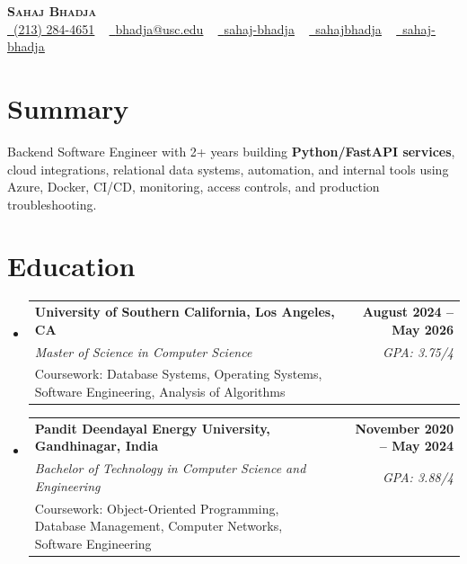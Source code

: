 \documentclass[letterpaper,10pt]{article}
\makeatletter
\newcommand{\sectionGap}{\vspace{-8pt}}
\newcommand{\resumeEduSubheading}[5]{\vspace{-1pt}\item\begin{tabular*}{1.0\textwidth}[t]{l@{\extracolsep{\fill}}r}\textbf{#1} & \textbf{\small #2} \\\textit{\small #3} & \textit{\small #4} \\\small #5 & \\\end{tabular*}\vspace{-4pt}}
\newcommand{\resumeSubHeadingListStart}{\begin{itemize}[leftmargin=0.0in, label={}]}
\newcommand{\resumeSubHeadingListEnd}{\end{itemize}}
\makeatother
\begin{document}
\begin{center}
{\Huge \scshape \textbf{Sahaj Bhadja}} \\ \vspace{1pt}
\small \href{tel:2132844651}{\faPhone\ \underline{(213) 284-4651}} ~ \href{mailto:bhadja@usc.edu}{\raisebox{-0.2\height}\faEnvelope\ \underline{bhadja@usc.edu}} ~
\href{https://www.linkedin.com/in/sahaj-bhadja/}{\raisebox{-0.2\height}\faLinkedin\ \underline{sahaj-bhadja}} ~ \href{https://github.com/SAHAJ-BHADJA}{\raisebox{-0.2\height}\faGithub\ \underline{sahajbhadja}} ~
\href{https://sahaj-bhadja.vercel.app/}{\raisebox{-0.2\height}\faGlobe\ \underline{sahaj-bhadja}}
\end{center}
\vspace{-16pt}
\section{Summary}
\begin{itemize}[leftmargin=0.15in, label={}]
\small{\item{Backend Software Engineer with 2+ years building \textbf{Python/FastAPI services}, cloud integrations, relational data systems, automation, and internal tools using Azure, Docker, CI/CD, monitoring, access controls, and production troubleshooting.}}
\end{itemize}
\sectionGap
\section{Education}
\resumeSubHeadingListStart
\resumeEduSubheading{University of Southern California, Los Angeles, CA}{August 2024 -- May 2026}{Master of Science in Computer Science}{GPA: 3.75/4}{Coursework: Database Systems, Operating Systems, Software Engineering, Analysis of Algorithms}
\resumeEduSubheading{Pandit Deendayal Energy University, Gandhinagar, India}{November 2020 -- May 2024}{Bachelor of Technology in Computer Science and Engineering}{GPA: 3.88/4}{Coursework: Object-Oriented Programming, Database Management, Computer Networks, Software Engineering}
\resumeSubHeadingListEnd
\sectionGap
\end{document}
